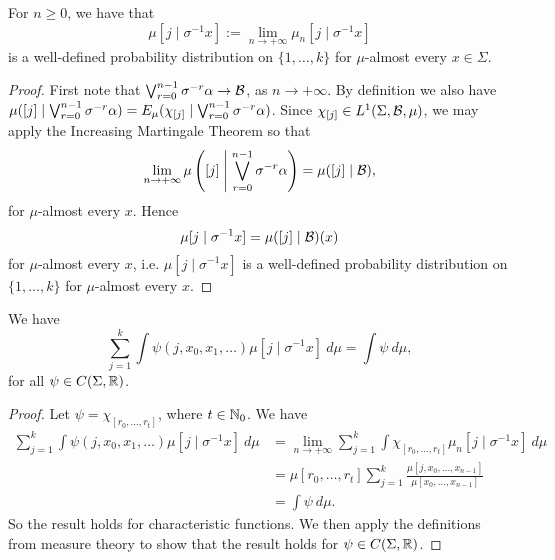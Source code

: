\begin{proposition}\label{prop:mu-sq-bkt-pd}
	For $n \geq 0$, we have that
	\[
		\mu[j \mid \sigma^{-1}{x}] := \lim_{n \to +\infty}{\mu_n[j \mid \sigma^{-1}{x}]}
	\]
	is a well-defined probability distribution on $\{1, \dots, k\}$ for $\mu$-almost every $x \in \Sigma$.
	\begin{proof}
		First note that $\bigvee_{r = 0}^{n - 1}{\sigma^{-r}{\alpha}} \to \mathcal{B}$, as $n \to +\infty$. By definition we also have $\mu([j] \mid \bigvee_{r = 0}^{n - 1}{\sigma^{-r}{\alpha}}) = E_\mu(\chi_{[j]} \mid \bigvee_{r = 0}^{n - 1}{\sigma^{-r}{\alpha}})$. Since $\chi_{[j]} \in L^1(\Sigma, \mathcal{B}, \mu)$, we may apply the Increasing Martingale Theorem so that
		\[
			\lim_{n \to +\infty}{\mu\left([j] \mathrel{}\middle|\mathrel{} \bigvee_{r = 0}^{n - 1}{\sigma^{-r}{\alpha}}\right)} = \mu([j] \mid \mathcal{B}),
		\]
		for $\mu$-almost every $x$. Hence
		\[
			\mu[j \mid \sigma^{-1}{x}] = \mu([j] \mid \mathcal{B})(x)
		\]
		for $\mu$-almost every $x$, i.e. $\mu[j \mid \sigma^{-1}{x}]$ is a well-defined probability distribution on $\{1, \dots, k\}$ for $\mu$-almost every $x$.
	\end{proof}
\end{proposition}

\begin{lemma} \label{lem:pp-prop-p36}
	We have
	\begin{equation}
		\sum_{j = 1}^k{\int{\psi(j, x_0, x_1, \dots) \mu[j \mid \sigma^{-1}{x}] \ d\mu}} = \int{\psi\ d\mu},
	\end{equation}
	for all $\psi \in C(\Sigma, \mathbb{R})$.
	\begin{proof}
		Let $\psi = \chi_{[r_0, \dots, r_t]}$, where $t \in \mathbb{N}_0$. We have
		\begin{align*}
			\sum_{j = 1}^k{\int{\psi(j, x_0, x_1, \dots) \mu[j \mid \sigma^{-1}{x}] \ d\mu}} &= \lim_{n \to +\infty}{\sum_{j = 1}^k{\int{\chi_{[r_0, \dots, r_t]} \mu_n[j \mid \sigma^{-1}{x}] \ d\mu}}} \\
				&= \mu[r_0, \dots, r_t] \sum_{j = 1}^k{\frac{\mu[j, x_0, \dots, x_{n - 1}]}{\mu[x_0, \dots, x_{n - 1}]}} \\
				&= \int{\psi\ d\mu}.
		\end{align*}
		So the result holds for characteristic functions. We then apply the definitions from measure theory to show that the result holds for $\psi \in C(\Sigma, \mathbb{R})$.
	\end{proof}
\end{lemma}

